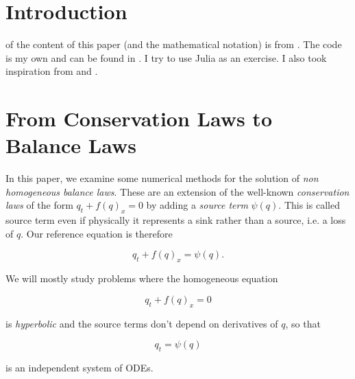 \documentclass[journal,onecolumn]{IEEEtran}
\begin{document}
\section {Introduction}

 of the content of this paper (and the mathematical notation) is from \cite{leveque}. The code is my own and can be found in \cite{github}. I try to use Julia as an exercise. I also took inspiration from \cite {clawpack} and \cite {riemann}.

\section{From Conservation Laws to Balance Laws}
In this paper, we examine some numerical methods for the solution of \textit{non homogeneous balance laws}. These are an extension of the well-known \textit{conservation laws} of the form $q_t+f(q)_x=0$ by adding a \textit{source term} $\psi(q)$. This is called source term even if physically it represents a sink rather than a source, i.e. a loss of $q$. Our reference equation is therefore

\begin{equation} \label{eq:template}
	q_t + f(q)_x = \psi(q).
\end{equation}

We will mostly study problems where the homogeneous equation

\begin{equation} \label{eq:hom}
	q_t +f(q)_x = 0
\end{equation}

is \textit{hyperbolic} and the source terms don't depend on derivatives of $q$, so that

\begin{equation} \label{eq:source}
	q_t = \psi(q)
\end{equation}

is an independent system of ODEs.








%
%
\end{document}
